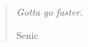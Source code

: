\vspace*{\fill}
\thispagestyle{empty}
\begin{quotation}
    \em
    Gotta go faster.

    \medskip
\raggedleft{}
    Senic
\end{quotation}
\vspace*{\fill}
